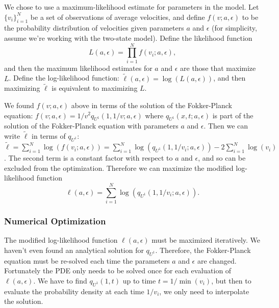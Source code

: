 We chose to use a maximum-likelihood estimate for parameters in the
model. Let $\{v_i\}_{i=1}^N$ be a set of observations of average
velocities, and define $f(v;a, \epsilon)$ to be the probability
distribution of velocities given parameters $a$ and $\epsilon$ (for
simplicity, assume we're working with the two-state model). Define the
likelihood function
\begin{equation}
  \label{eq:likelihood}
  L(a, \epsilon) = \prod_{i=1}^N f(v_i; a, \epsilon),
\end{equation}
and then the maximum likelihood estimates for $a$ and $\epsilon$ are
those that maximize $L$. Define the log-likelihood function:
$\tilde{\ell}(a, \epsilon) = \log(L(a, \epsilon))$, and then
maximizing $\tilde{\ell}$ is equivalent to maximizing $L$.

We found $f(v; a, \epsilon)$ above in terms of the solution of the
Fokker-Planck equation: $f(v; a, \epsilon) = 1/v^2 q_{U^1}(1, 1/v; a,
\epsilon)$ where $q_{U^1}(x, t; a, \epsilon)$ is part of the solution
of the Fokker-Planck equation with parameters $a$ and $\epsilon$. Then
we can write $\tilde{\ell}$ in terms of $q_{U^1}$:
$\tilde{\ell} = \sum_{i=1}^N \log(f(v_i; a, \epsilon)) = \sum_{i=1}^N
\log(q_{U^1}(1, 1/v_i; a, \epsilon)) - 2\sum_{i=1}^N \log(v_i)$. The
second term is a constant factor with respect to $a$ and $\epsilon$,
and so can be excluded from the optimization. Therefore we can
maximize the modified log-likelihood function
\begin{equation}
  \label{eq:mod-log-like}
  \ell(a, \epsilon) = \sum_{i=1}^N \log(q_{U^1}(1, 1/v_i; a, \epsilon)).
\end{equation}

\subsubsection{Numerical Optimization}
\label{sec:numer-optim}

The modified log-likelihood function $\ell(a, \epsilon)$ must be
maximized iteratively. We haven't even found an analytical solution
for $q_{U^1}$. Therefore, the Fokker-Planck equation must be re-solved
each time the parameters $a$ and $\epsilon$ are changed. Fortunately
the PDE only needs to be solved once for each evaluation of
$\ell(a, \epsilon)$. We have to find $q_{U^1}(1, t)$ up to time
$t = 1/\min(v_i)$, but then to evaluate the probability density at
each time $1/v_i$, we only need to interpolate the solution.


